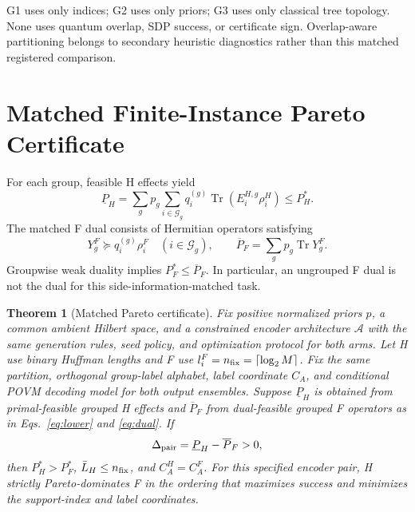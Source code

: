 \documentclass[reprint,amsmath,amssymb,aps,pra,floatfix]{revtex4-2}
\newtheorem{theorem}{Theorem}
\begin{document}
G1 uses only indices; G2 uses only priors; G3 uses only classical tree topology. None uses quantum overlap, SDP success, or certificate sign. Overlap-aware partitioning belongs to secondary heuristic diagnostics rather than this matched registered comparison.

\section{Matched Finite-Instance Pareto Certificate}
\label{sec:certificate}
For each group, feasible H effects yield
\begin{equation}
 \underline P_H=\sum_g p_g\sum_{i\in\mathcal G_g}q_i^{(g)}
     \operatorname{Tr}(E_i^{H,g}\rho_i^H)\le P_H^*.
 \label{eq:lower}
\end{equation}
The matched F dual consists of Hermitian operators satisfying
\begin{equation}
 Y_g^F\succeq q_i^{(g)}\rho_i^F\quad(i\in\mathcal G_g),\qquad
 \overline P_F=\sum_g p_g\operatorname{Tr}Y_g^F.
 \label{eq:dual}
\end{equation}
Groupwise weak duality implies $P_F^*\le\overline P_F$. In particular, an ungrouped F dual is not the dual for this side-information-matched task.

\begin{theorem}[Matched Pareto certificate]
\label{thm:main}
Fix positive normalized priors $p$, a common ambient Hilbert space, and a constrained encoder architecture $\mathcal A$ with the same generation rules, seed policy, and optimization protocol for both arms. Let H use binary Huffman lengths and F use $l_i^F=n_{\rm fix}=\lceil\log_2 M\rceil$. Fix the same partition, orthogonal group-label alphabet, label coordinate $C_A$, and conditional POVM decoding model for both output ensembles. Suppose $\underline P_H$ is obtained from primal-feasible grouped H effects and $\overline P_F$ from dual-feasible grouped F operators as in Eqs.~\eqref{eq:lower} and \eqref{eq:dual}. If
\begin{equation}
 \Delta_{\rm pair}=\underline P_H-\overline P_F>0,
 \label{eq:certificate}
\end{equation}
then $P_H^*>P_F^*$, $\bar L_H\le n_{\rm fix}$, and $C_A^H=C_A^F$. For this specified encoder pair, H strictly Pareto-dominates F in the ordering that maximizes success and minimizes the support-index and label coordinates.
\end{theorem}
\end{document}
